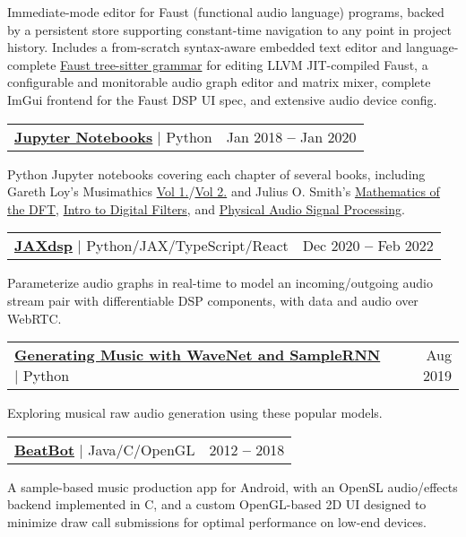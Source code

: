\documentclass[letterpaper,11pt]{article}
\makeatletter
\newcommand{\resumeProjectHeading}[2]{
    \vspace{3pt}\item
    \begin{tabular*}{0.97\textwidth}{l@{\extracolsep{\fill}}r}
      \small#1 & #2 \\
    \end{tabular*}\vspace{-9pt}
}
\newcommand{\resumeSectionBody}[1]{
  \vspace{0.7em}
  \small #1
  \vspace{-5pt}
}
\makeatother
\begin{document}
      \resumeSectionBody{
        Immediate-mode editor for Faust (functional audio language) programs, backed by a persistent store supporting constant-time navigation to any point in project history.
        Includes a from-scratch syntax-aware embedded text editor and language-complete \href{https://github.com/khiner/tree-sitter-faust}{Faust tree-sitter grammar} for editing LLVM JIT-compiled Faust,
        a configurable and monitorable audio graph editor and matrix mixer,
        complete ImGui frontend for the Faust DSP UI spec, and extensive audio device config.}
    \resumeProjectHeading
      {\href{https://github.com/khiner/notebooks}{\textbf{Jupyter Notebooks}} $|$ Python}{Jan 2018 \textbf{--} Jan 2020}

      \resumeSectionBody{
        Python Jupyter notebooks covering each chapter of several books, including Gareth Loy’s
        Musimathics \href{https://karlhiner.com/jupyter_notebooks/musimathics_volume_1}{Vol 1.}/\href{https://karlhiner.com/jupyter_notebooks/musimathics_volume_2}{Vol 2.}
        and Julius O. Smith’s \href{https://karlhiner.com/jupyter_notebooks/mathematics_of_the_dft}{Mathematics of the DFT}, \href{https://karlhiner.com/jupyter_notebooks/intro_to_digital_filters}{Intro to Digital Filters}, and \href{https://karlhiner.com/jupyter_notebooks/physical_audio_signal_processing}{Physical Audio Signal Processing}.
      }
    \resumeProjectHeading
      {\href{https://github.com/khiner/jaxdsp}{\textbf{JAXdsp}} $|$ Python/JAX/TypeScript/React}{Dec 2020 \textbf{--} Feb 2022}

      \resumeSectionBody{
        Parameterize audio graphs in real-time to model an incoming/outgoing audio stream pair with differentiable DSP components, with data and audio over WebRTC.
      }
    \resumeProjectHeading
      {\href{https://karlhiner.com/music_generation/wavenet_and_samplernn}{\textbf{Generating Music with WaveNet and SampleRNN}} $|$ Python}{Aug 2019}

      \resumeSectionBody{
        Exploring musical raw audio generation using these popular models.
      }
    \resumeProjectHeading
      {\href{https://github.com/khiner/beatbot}{\textbf{BeatBot}} $|$ Java/C/OpenGL}{2012 \textbf{--} 2018}

      \resumeSectionBody{
        A sample-based music production app for Android, with an OpenSL audio/effects backend implemented in C, and a custom OpenGL-based 2D UI designed to minimize draw call submissions for optimal performance on low-end devices.
      }
\end{document}
